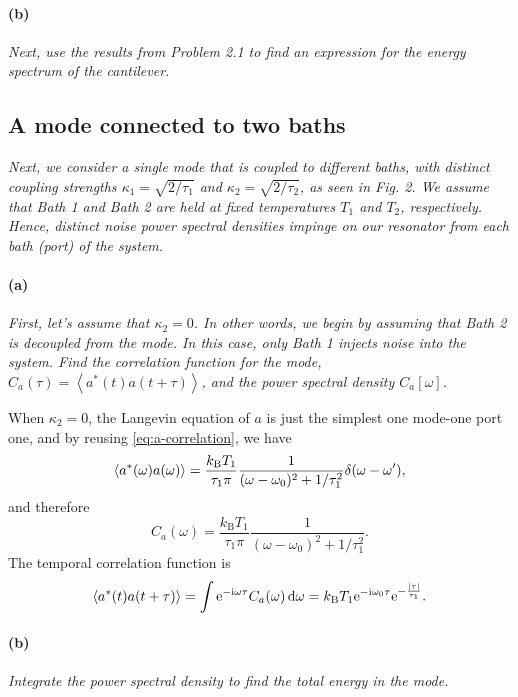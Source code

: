 \documentclass[hyperref, a4paper]{article}
\newcommand*{\ii}{\mathrm{i}}
\newcommand*{\ee}{\mathrm{e}}
\newcommand*{\kB}{k_{\text{B}}}
\begin{document}
\paragraph*{(b)} \textit{Next, use the results from Problem 2.1 to find an expression for the energy spectrum of the cantilever.} 



\subsection{A mode connected to two baths}

\textit{Next, we consider a single mode that is coupled to different baths, with distinct coupling strengths $\kappa_1=\sqrt{2 / \tau_1}$ and $\kappa_2=\sqrt{2 / \tau_2}$, as seen in Fig. 2. We assume that Bath 1 and Bath 2 are held at fixed temperatures $T_1$ and $T_2$, respectively. Hence, distinct noise power spectral densities impinge on our resonator from each bath (port) of the system.}

\paragraph*{(a)} \textit{First, let's assume that $\kappa_2=0$. In other words, we begin by assuming that Bath 2 is decoupled from the mode. In this case, only Bath 1 injects noise into the system. Find the correlation function for the mode, $C_a(\tau)=\left\langle a^*(t) a(t+\tau)\right\rangle$, and the power spectral density $C_a[\omega]$.} 

When $\kappa_2 = 0$, the Langevin equation of $a$ is just the simplest one mode-one port one,
and by reusing \eqref{eq:a-correlation}, we have 
\begin{equation}
    \expval{a^*(\omega) a(\omega)} = \frac{\kB T_1}{\tau_1 \pi} \frac{1}{(\omega - \omega_0)^2 + 1 / \tau_1^2} \delta(\omega - \omega'),
\end{equation}
and therefore
\begin{equation}
    C_a(\omega) = \frac{\kB T_1}{\tau_1 \pi} \frac{1}{(\omega - \omega_0)^2 + 1 / \tau_1^2}.
\end{equation}
The temporal correlation function is 
\begin{equation}
    \expval{a^*(t) a(t + \tau)} = \int \ee^{- \ii \omega \tau} C_a(\omega) \dd{\omega} = 
    \kB T_1 \ee^{- \ii \omega_0 \tau} \ee^{- \frac{\abs*{\tau}}{\tau_1}}.
\end{equation}

\paragraph*{(b)} \textit{Integrate the power spectral density to find the total energy in the mode.} 
\end{document}
